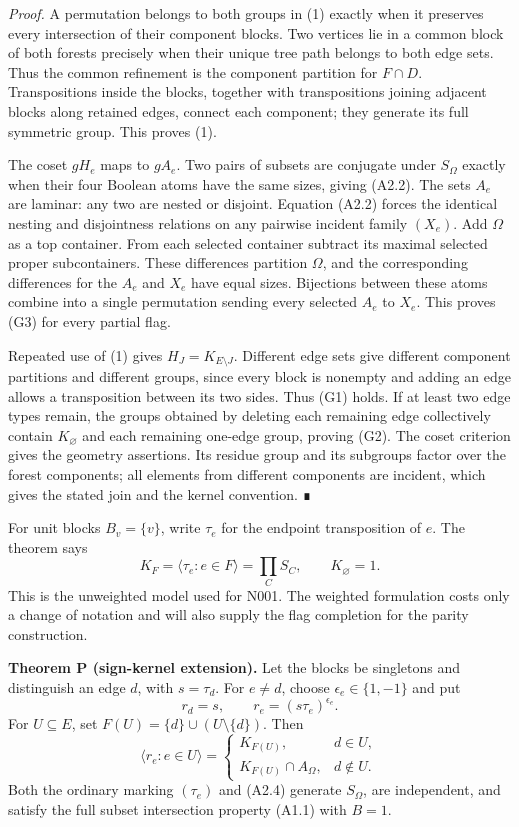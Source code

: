 \documentclass[
  10pt,
  letterpaper,
]{article}
\newcounter{none} %
\begin{document}
\emph{Proof.} A permutation belongs to both groups in (1) exactly when
it preserves every intersection of their component blocks. Two vertices
lie in a common block of both forests precisely when their unique tree
path belongs to both edge sets. Thus the common refinement is the
component partition for \(F\cap D\). Transpositions inside the blocks,
together with transpositions joining adjacent blocks along retained
edges, connect each component; they generate its full symmetric group.
This proves (1).

The coset \(gH_e\) maps to \(gA_e\). Two pairs of subsets are conjugate
under \(S_\Omega\) exactly when their four Boolean atoms have the same
sizes, giving (A2.2). The sets \(A_e\) are laminar: any two are nested
or disjoint. Equation (A2.2) forces the identical nesting and
disjointness relations on any pairwise incident family \((X_e)\). Add
\(\Omega\) as a top container. From each selected container subtract its
maximal selected proper subcontainers. These differences partition
\(\Omega\), and the corresponding differences for the \(A_e\) and
\(X_e\) have equal sizes. Bijections between these atoms combine into a
single permutation sending every selected \(A_e\) to \(X_e\). This
proves (G3) for every partial flag.

Repeated use of (1) gives \(H_J=K_{E\setminus J}\). Different edge sets
give different component partitions and different groups, since every
block is nonempty and adding an edge allows a transposition between its
two sides. Thus (G1) holds. If at least two edge types remain, the
groups obtained by deleting each remaining edge collectively contain
\(K_\varnothing\) and each remaining one-edge group, proving (G2). The
coset criterion gives the geometry assertions. Its residue group and its
subgroups factor over the forest components; all elements from different
components are incident, which gives the stated join and the kernel
convention. ∎

For unit blocks \(B_v=\{v\}\), write \(\tau_e\) for the endpoint
transposition of \(e\). The theorem says \[
K_F=\langle\tau_e:e\in F\rangle
 =\prod_C S_C,\qquad K_\varnothing=1.
\tag{A2.3}
\] This is the unweighted model used for N001. The weighted formulation
costs only a change of notation and will also supply the flag completion
for the parity construction.

\textbf{Theorem P (sign-kernel extension).} Let the blocks be singletons
and distinguish an edge \(d\), with \(s=\tau_d\). For \(e\ne d\), choose
\(\epsilon_e\in\{1,-1\}\) and put \[
r_d=s,\qquad r_e=(s\tau_e)^{\epsilon_e}.
\tag{A2.4}
\] For \(U\subseteq E\), set \(F(U)=\{d\}\cup(U\setminus\{d\})\). Then
\[
\langle r_e:e\in U\rangle=
\begin{cases}
K_{F(U)},&d\in U,\\
K_{F(U)}\cap A_\Omega,&d\notin U.
\end{cases}
\tag{A2.5}
\] Both the ordinary marking \((\tau_e)\) and (A2.4) generate
\(S_\Omega\), are independent, and satisfy the full subset intersection
property (A1.1) with \(B=1\).
\end{document}
